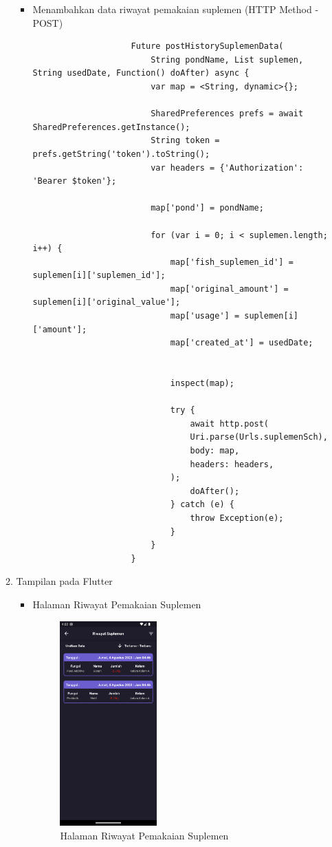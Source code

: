\begin{spacing}{1.5}
\begin{enumerate}
\begin{enumerate}
\begin{itemize}
				\item Menambahkan data riwayat pemakaian suplemen (HTTP Method - POST)
				
				\begin{lstlisting}
					Future postHistorySuplemenData(
						String pondName, List suplemen, String usedDate, Function() doAfter) async {
						var map = <String, dynamic>{};

						SharedPreferences prefs = await SharedPreferences.getInstance();
						String token = prefs.getString('token').toString();
						var headers = {'Authorization': 'Bearer $token'};

						map['pond'] = pondName;

						for (var i = 0; i < suplemen.length; i++) {
							map['fish_suplemen_id'] = suplemen[i]['suplemen_id'];
							map['original_amount'] = suplemen[i]['original_value'];
							map['usage'] = suplemen[i]['amount'];
      						map['created_at'] = usedDate;


							inspect(map);

							try {
								await http.post(
								Uri.parse(Urls.suplemenSch),
								body: map,
								headers: headers,
							);
								doAfter();
							} catch (e) {
								throw Exception(e);
							}
						}
					}
				\end{lstlisting}	
			\end{itemize}

			\item Tampilan pada Flutter
			
			\begin{itemize}
				\item Halaman Riwayat Pemakaian Suplemen
				
				\begin{figure}[H]
					\centering
					\includegraphics[width=0.4\textwidth]{gambar/sprint4/suplemen_hs.png}
					\caption{Halaman Riwayat Pemakaian Suplemen}
				\end{figure}


\end{itemize}
\end{enumerate}
\end{enumerate}
\end{spacing}
